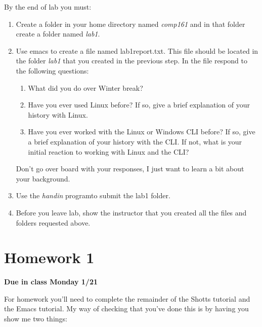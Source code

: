 \documentclass[nobib]{tufte-handout}
\begin{document}
By the end of lab you must:
\begin{enumerate}
\item Create a folder in your home directory named \textit{comp161} and in that folder create a folder named \textit{lab1}.
\item Use emacs to create a file named lab1report.txt. This file should be located in the folder \textit{lab1} that you created in the previous step. In the file respond to the following questions:
\begin{enumerate}
\item What did you do over Winter break?
\item Have you ever used Linux before? If so, give a brief explanation of your history with Linux.
\item Have you ever worked with the Linux or Windows CLI before? If so, give a brief explanation of your history with the CLI\@. If not, what is your initial reaction to working with Linux and the CLI\@?
\end{enumerate}
Don't go over board with your responses, I just want to learn a bit about your background.
\item Use the \textit{handin} programto submit the lab1 folder.
\item Before you leave lab, show the instructor that you created all the files and folders requested above.
\end{enumerate}

\section{Homework 1}

\begin{center}
\textbf{Due in class Monday 1/21}
\end{center}

For homework you'll need to complete the remainder of the Shotts tutorial and the Emacs tutorial.  My way of checking that you've done this is by having you show me two things:
\end{document}
